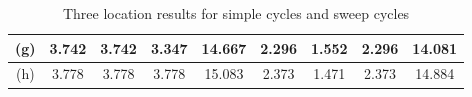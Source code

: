 \documentclass[11pt,a4paper]{article}
\begin{document}
\begin{table}[H]
\begin{tabular}{c|cccc|cccc|}
\multicolumn{1}{|c|}{(g)}  & \multicolumn{1}{c|}{3.742} & \multicolumn{1}{c|}{3.742} & \multicolumn{1}{c|}{3.347} & 14.667                 & \multicolumn{1}{c|}{2.296} & \multicolumn{1}{c|}{1.552} & \multicolumn{1}{c|}{2.296} & 14.081                                 \\ \hline
\multicolumn{1}{|c|}{(h)}  & \multicolumn{1}{c|}{3.778} & \multicolumn{1}{c|}{3.778} & \multicolumn{1}{c|}{3.778} & 15.083                 & \multicolumn{1}{c|}{2.373} & \multicolumn{1}{c|}{1.471} & \multicolumn{1}{c|}{2.373} & 14.884                                 \\ \hline
\end{tabular}
\caption{Three location results for simple cycles and sweep cycles}
\label{tbl: Simple Cycle and Sweep Cycle Results}
\end{table}
\end{document}
